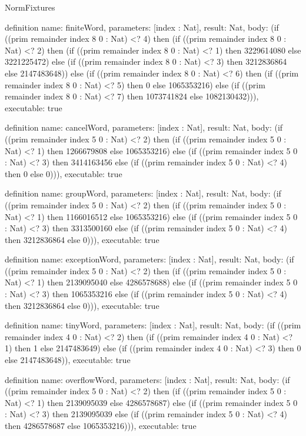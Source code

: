 \begin{lexlean}{NormFixtures}
\begin{semanticmodule}
definition{
  name: finiteWord,
  parameters: [index : Nat],
  result: Nat,
  body: (if ((prim remainder index 8 0 : Nat) <? 4) then (if ((prim remainder index 8 0 : Nat) <? 2) then (if ((prim remainder index 8 0 : Nat) <? 1) then 3229614080 else 3221225472) else (if ((prim remainder index 8 0 : Nat) <? 3) then 3212836864 else 2147483648)) else (if ((prim remainder index 8 0 : Nat) <? 6) then (if ((prim remainder index 8 0 : Nat) <? 5) then 0 else 1065353216) else (if ((prim remainder index 8 0 : Nat) <? 7) then 1073741824 else 1082130432))),
  executable: true
}

definition{
  name: cancelWord,
  parameters: [index : Nat],
  result: Nat,
  body: (if ((prim remainder index 5 0 : Nat) <? 2) then (if ((prim remainder index 5 0 : Nat) <? 1) then 1266679808 else 1065353216) else (if ((prim remainder index 5 0 : Nat) <? 3) then 3414163456 else (if ((prim remainder index 5 0 : Nat) <? 4) then 0 else 0))),
  executable: true
}

definition{
  name: groupWord,
  parameters: [index : Nat],
  result: Nat,
  body: (if ((prim remainder index 5 0 : Nat) <? 2) then (if ((prim remainder index 5 0 : Nat) <? 1) then 1166016512 else 1065353216) else (if ((prim remainder index 5 0 : Nat) <? 3) then 3313500160 else (if ((prim remainder index 5 0 : Nat) <? 4) then 3212836864 else 0))),
  executable: true
}

definition{
  name: exceptionWord,
  parameters: [index : Nat],
  result: Nat,
  body: (if ((prim remainder index 5 0 : Nat) <? 2) then (if ((prim remainder index 5 0 : Nat) <? 1) then 2139095040 else 4286578688) else (if ((prim remainder index 5 0 : Nat) <? 3) then 1065353216 else (if ((prim remainder index 5 0 : Nat) <? 4) then 3212836864 else 0))),
  executable: true
}

definition{
  name: tinyWord,
  parameters: [index : Nat],
  result: Nat,
  body: (if ((prim remainder index 4 0 : Nat) <? 2) then (if ((prim remainder index 4 0 : Nat) <? 1) then 1 else 2147483649) else (if ((prim remainder index 4 0 : Nat) <? 3) then 0 else 2147483648)),
  executable: true
}

definition{
  name: overflowWord,
  parameters: [index : Nat],
  result: Nat,
  body: (if ((prim remainder index 5 0 : Nat) <? 2) then (if ((prim remainder index 5 0 : Nat) <? 1) then 2139095039 else 4286578687) else (if ((prim remainder index 5 0 : Nat) <? 3) then 2139095039 else (if ((prim remainder index 5 0 : Nat) <? 4) then 4286578687 else 1065353216))),
  executable: true
}


\end{semanticmodule}
\end{lexlean}
